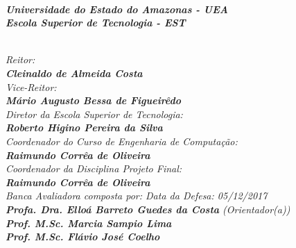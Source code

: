 \begin{spacing}{1.4}
\textit{\textbf{\\
Universidade do Estado do Amazonas - UEA\\
Escola Superior de Tecnologia - EST}}

\textit{\\ Reitor:\\ \textbf{Cleinaldo de Almeida Costa}}\\
\textit{Vice-Reitor:\\ \textbf{Mário Augusto Bessa de Figueirêdo}}
\\
\textit{
Diretor da Escola Superior de Tecnologia:\\
\textbf{Roberto Higino Pereira da Silva}}
\\
\textit{
Coordenador do Curso de Engenharia de Computação:\\
\textbf{Raimundo Corrêa de Oliveira}}
\\
\textit{
Coordenador da Disciplina Projeto Final:\\
\textbf{Raimundo Corrêa de Oliveira}}
\\[12pt]
\textit{
Banca Avaliadora composta por: \hfill Data da Defesa: 05/12/2017\\
}
\textit{
\textbf{Profa. Dra. Elloá Barreto Guedes da Costa} (Orientador(a))\\
\textbf{Prof. M.Sc. Marcia Sampio Lima}\\%
\textbf{Prof. M.Sc. Flávio José Coelho}
}
\ \ \\
 \begin{small}
\begin{center}
\end{center}
\end{small}
\end{spacing}
 \newpage
